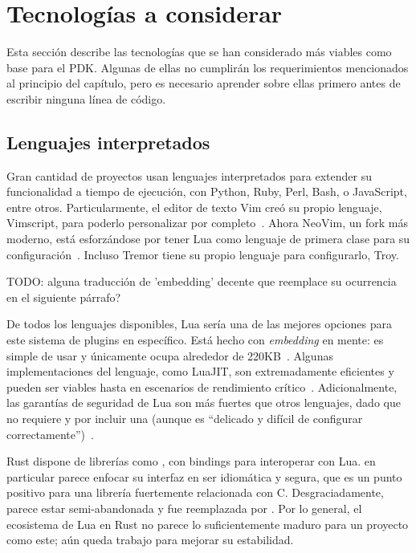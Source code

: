 \section{Tecnologías a considerar}

Esta sección describe las tecnologías que se han considerado más viables como
base para el PDK. Algunas de ellas no cumplirán los requerimientos mencionados
al principio del capítulo, pero es necesario aprender sobre ellas primero antes
de escribir ninguna línea de código.

\subsection{Lenguajes interpretados}

Gran cantidad de proyectos usan lenguajes interpretados para extender su
funcionalidad a tiempo de ejecución, con Python, Ruby, Perl, Bash, o JavaScript,
entre otros. Particularmente, el editor de texto Vim creó su propio lenguaje,
Vimscript, para poderlo personalizar por completo~\cite{vimscript}. Ahora
NeoVim, un fork más moderno, está esforzándose por tener Lua como lenguaje de
primera clase para su configuración~\cite{nvimlua}. Incluso Tremor tiene su
propio lenguaje para configurarlo, Troy.

TODO: alguna traducción de 'embedding' decente que reemplace su ocurrencia en el
siguiente párrafo?

De todos los lenguajes disponibles, Lua sería una de las mejores opciones para
este sistema de plugins en específico. Está hecho con \emph{embedding} en mente:
es simple de usar y únicamente ocupa alrededor de
220KB~\cite{ierusalimschy2006programming}. Algunas implementaciones del
lenguaje, como LuaJIT, son extremadamente eficientes y pueden ser viables hasta
en escenarios de rendimiento crítico~\cite{luajitperf}. Adicionalmente, las
garantías de seguridad de Lua son más fuertes que otros lenguajes, dado que no
requiere \unsafe y por incluir una \sandbox (aunque es ``delicado y difícil de
configurar correctamente'')~\cite{luasandboxes}.

Rust dispone de librerías como , con bindings para interoperar
con Lua.  en particular parece enfocar su interfaz en ser idiomática
y segura, que es un punto positivo para una librería fuertemente relacionada con
C. Desgraciadamente, parece estar semi-abandonada y fue reemplazada por
. Por lo general, el ecosistema de Lua en Rust no parece lo
suficientemente maduro para un proyecto como este; aún queda trabajo para
mejorar su estabilidad.

